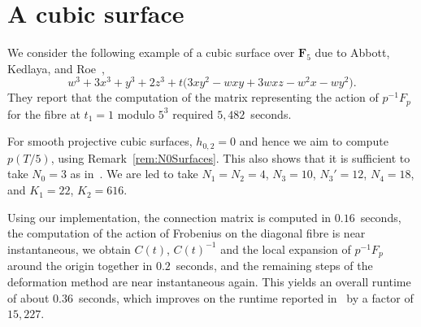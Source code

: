 \section{A cubic surface}

We consider the following example of a cubic surface over 
$\mathbf{F}_5$ due to Abbott, Kedlaya, and 
Roe~\citep[Example~4.3.2]{AbbottKedlayaRoe2006},
\begin{equation*}
w^3 + 3 x^3 + y^3 + 2 z^3 
+ t \bigl( 3 x y^2 - w x y + 3 w x z - w^2 x - w y^2 \bigr).
\end{equation*}
They report that the computation of the matrix representing 
the action of $p^{-1} F_p$ for the fibre at $t_1 = 1$ modulo 
$5^3$ required $5,482$~seconds.

For smooth projective cubic surfaces, $h_{0,2} = 0$ and hence 
we aim to compute $p(T/5)$, using Remark~\ref{rem:N0Surfaces}. 
This also shows that it is sufficient to take $N_0 = 3$ as 
in~\citep{AbbottKedlayaRoe2006}.  We are led to 
take $N_1 = N_2 = 4$, $N_3 = 10$, $N_3' = 12$, $N_4 = 18$, and 
$K_1 = 22$, $K_2 = 616$.

Using our implementation, the connection matrix is computed 
in $0.16$~seconds, the computation of the action of Frobenius 
on the diagonal fibre is near instantaneous, we obtain $C(t)$, 
$C(t)^{-1}$ and the local expansion of $p^{-1} F_p$ around the 
origin together in $0.2$~seconds, and the remaining steps of 
the deformation method are near instantaneous again.  This yields 
an overall runtime of about $0.36$~seconds, which improves on 
the runtime reported in~\citep{AbbottKedlayaRoe2006} by a factor 
of $15,227$.

